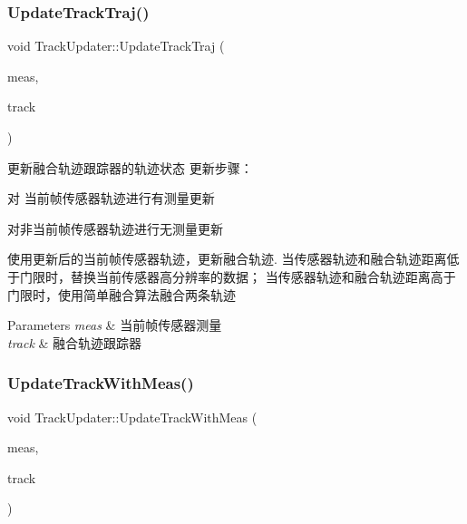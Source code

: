 \subsubsection{\texorpdfstring{Update\+Track\+Traj()}{UpdateTrackTraj()}}
{\footnotesize\ttfamily void Track\+Updater\+::\+Update\+Track\+Traj (\begin{DoxyParamCaption}\item[{const Sensor\+Object \&}]{meas,  }\item[{Fusion\+Track \&}]{track }\end{DoxyParamCaption})\hspace{0.3cm}{\ttfamily [private]}}



更新融合轨迹跟踪器的轨迹状态 更新步骤： 


\begin{DoxyEnumerate}
\item 对 当前帧传感器轨迹进行有测量更新
\item 对非当前帧传感器轨迹进行无测量更新
\item 使用更新后的当前帧传感器轨迹，更新融合轨迹. 当传感器轨迹和融合轨迹距离低于门限时，替换当前传感器高分辨率的数据； 当传感器轨迹和融合轨迹距离高于门限时，使用简单融合算法融合两条轨迹 
\begin{DoxyParams}{Parameters}
{\em meas} & 当前帧传感器测量 \\
\hline
{\em track} & 融合轨迹跟踪器 \\
\hline
\end{DoxyParams}

\end{DoxyEnumerate}\mbox{\label{classTrackUpdater_aa87416c54850c730536091a6a8436a9e}} 
\subsubsection{\texorpdfstring{Update\+Track\+With\+Meas()}{UpdateTrackWithMeas()}}
{\footnotesize\ttfamily void Track\+Updater\+::\+Update\+Track\+With\+Meas (\begin{DoxyParamCaption}\item[{const Sensor\+Object \&}]{meas,  }\item[{Fusion\+Track \&}]{track }\end{DoxyParamCaption})\hspace{0.3cm}{\ttfamily [private]}}



